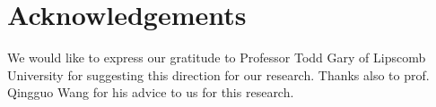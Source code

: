 \documentclass[sigconf]{acmart}
\begin{document}

\section{Acknowledgements}
We would like to express our gratitude to Professor Todd Gary of Lipscomb University for suggesting this direction for our research.  Thanks also to prof. Qingguo Wang for his advice to us for this research.
  

  
  
  
  

\end{document}
